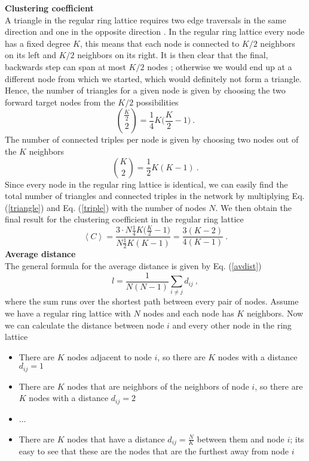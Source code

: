 \documentclass[11 pt , letterpaper , twoside , openright]{book}
\begin{document}
\textbf{Clustering coefficient}\\
\newline
A triangle in the regular ring lattice requires two edge traversals in the same direction and one in the opposite direction \cite{Pele2015}. In the regular ring lattice every node has a fixed degree $K$, this means that each node is connected to $K/2$ neighbors on its left and $K/2$ neighbors on its right. It is then clear that the final, backwards step can span at most $K/2$ nodes \cite{Pele2015}; otherwise we would end up at a different node from which we started, which would definitely not form a triangle.\\
Hence, the number of triangles for a given node is given by choosing the two forward target nodes from the $K/2$ possibilities \cite{Pele2015}
\begin{equation}\label{triangle}
	\binom{\frac{K}{2}}{2} = \frac{1}{4} K \bigg(\frac{K}{2} - 1 \bigg) \ .
\end{equation}
The number of connected triples per node is given by choosing two nodes out of the $K$ neighbors \cite{Pele2015}
\begin{equation}\label{triple}
	\binom{K}{2} = \frac{1}{2} K (K-1) \ .
\end{equation}
Since every node in the regular ring lattice is identical, we can easily find the total number of triangles and connected triples in the network by multiplying Eq. (\ref{triangle}) and Eq. (\ref{triple}) with the number of nodes $N$. We then obtain the final result for the clustering coefficient in the regular ring lattice \cite{Pele2015}
\begin{equation}
	\left<C\right> = \frac{3\cdot N \frac{1}{4} K \bigg(\frac{K}{2} - 1 \bigg)}{N \frac{1}{2} K (K-1)} = \frac{3(K-2)}{4(K-1)} \ .
\end{equation}
\newline
\textbf{Average distance}\\
\newline
The general formula for the average distance is given by Eq. (\ref{avdist})
\begin{equation}
	l = \frac{1}{N(N-1)} \sum_{i \neq j} d_{ij} \ ,
\end{equation}
where the sum runs over the shortest path between every pair of nodes. Assume we have a regular ring lattice with $N$ nodes and each node has $K$ neighbors. Now we can calculate the distance between node $i$ and every other node in the ring lattice
\begin{itemize}
	\item There are $K$ nodes adjacent to node $i$, so there are $K$ nodes with a distance $d_{ij} = 1$
	\item There are $K$ nodes that are neighbors of the neighbors of node $i$, so there are $K$ nodes with a distance $d_{ij} = 2$
	\item ...
	\item There are $K$ nodes that have a distance $d_{ij} = \frac{N}{K}$ between them and node $i$; its easy to see that these are the nodes that are the furthest away from node $i$ 
\end{itemize}  
\end{document}
